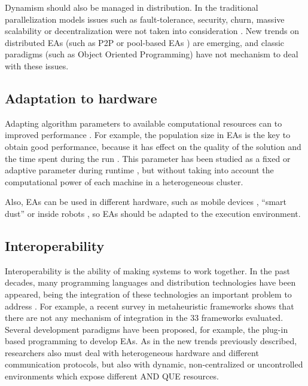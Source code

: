 Dynamism should also be managed in distribution. In the traditional parallelization models \cite{alba2002parallelism} issues such as fault-tolerance, security, churn, massive scalability or decentralization were not taken into consideration \cite{Alba13parallel}. New trends on distributed EAs (such as P2P \cite{} or pool-based EAs \cite{merelo2012pool}) are emerging,  and classic paradigms (such as Object Oriented Programming) have not mechanism to deal with these issues.

\subsection{Adaptation to hardware}
Adapting algorithm parameters to available computational resources can to improved performance \cite{AutomaticallyConfiguringStyles12}.  For example, the population size in EAs is the key to obtain good performance, because it has effect on the quality of the solution and the time spent during the run \cite{ShrinkageLaredo09}. This parameter has been studied as a fixed \cite{SizingHarik99} or adaptive parameter during runtime \cite{AdaptiveLobo07,SelfRegulatedSizeFernandes06}, but without taking into account the computational power of each machine in a heterogeneous cluster. 

Also, EAs can be used in different hardware, such as mobile devices \cite{Garcia2009Mobile}, ``smart dust'' \cite{Rollings2008smartdust} or inside robots \cite{Garcia2012testing}, so EAs should be adapted to the execution environment.


\subsection{Interoperability}
Interoperability is the ability of making systems to work together. In the past decades, many programming languages and distribution technologies have been appeared, being the integration of these technologies an important problem to address \cite{Papazoglou2007SOA}. For example, a recent survey in metaheuristic frameworks \cite{SURVEYMOFS} shows that there are not any mechanism of integration in the 33 frameworks evaluated. Several development paradigms have been proposed, for example, the plug-in based programming \cite{WagnerPlugins07} to develop EAs. As in the new trends previously described, researchers also must deal  with heterogeneous hardware and different communication protocols, but also with dynamic, non-centralized or uncontrolled environments which expose different AND QUE resources.

